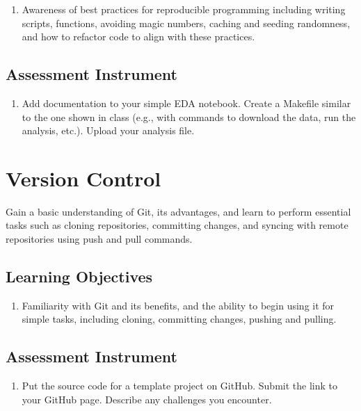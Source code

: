 \begin{enumerate}
    \item Awareness of best practices for reproducible programming including writing scripts, functions, avoiding magic numbers, caching and seeding randomness, and how to refactor code to align with these practices.
\end{enumerate}

\subsection{Assessment Instrument}

\begin{enumerate}
    \item Add documentation to your simple EDA notebook. Create a Makefile similar to the one shown in class (e.g., with commands to download the data, run the analysis, etc.). Upload your analysis file.
\end{enumerate}

\section{Version Control}
\label{sec:5.4}

Gain a basic understanding of Git, its advantages, and learn to perform essential tasks such as cloning repositories, committing changes, and syncing with remote repositories using push and pull commands.

\subsection{Learning Objectives}

\begin{enumerate}
    \item Familiarity with Git and its benefits, and the ability to begin using it for simple tasks, including cloning, committing changes, pushing and pulling.
\end{enumerate}

\subsection{Assessment Instrument}

\begin{enumerate}
    \item Put the source code for a template project on GitHub. Submit the link to your GitHub page. Describe any challenges you encounter.
\end{enumerate}

